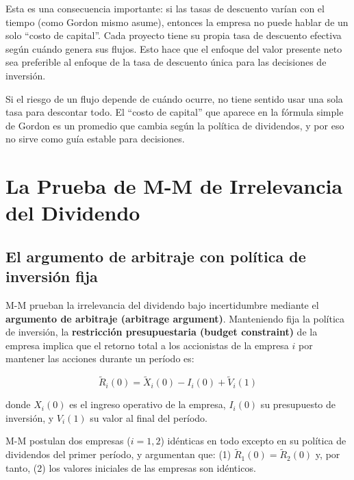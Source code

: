 \documentclass[12pt]{article}
\begin{document}
\begin{explicacion}
Esta es una consecuencia importante: si las tasas de descuento var\'ian con el tiempo (como Gordon mismo asume), entonces la empresa no puede hablar de un solo ``costo de capital''. Cada proyecto tiene su propia tasa de descuento efectiva seg\'un cu\'ando genera sus flujos. Esto hace que el enfoque del valor presente neto sea preferible al enfoque de la tasa de descuento \'unica para las decisiones de inversi\'on.
\end{explicacion}

\begin{intuicion}
Si el riesgo de un flujo depende de cu\'ando ocurre, no tiene sentido usar una sola tasa para descontar todo. El ``costo de capital'' que aparece en la f\'ormula simple de Gordon es un promedio que cambia seg\'un la pol\'itica de dividendos, y por eso no sirve como gu\'ia estable para decisiones.
\end{intuicion}

\section{La Prueba de M-M de Irrelevancia del Dividendo}

\subsection{El argumento de arbitraje con pol\'itica de inversi\'on fija}

M-M prueban la irrelevancia del dividendo bajo incertidumbre mediante el \textbf{argumento de arbitraje (arbitrage argument)}. Manteniendo fija la pol\'itica de inversi\'on, la \textbf{restricci\'on presupuestaria (budget constraint)} de la empresa implica que el retorno total a los accionistas de la empresa $i$ por mantener las acciones durante un per\'iodo es:

\[
\tilde{R}_i(0) = \tilde{X}_i(0) - I_i(0) + \tilde{V}_i(1)
\]

donde $X_i(0)$ es el ingreso operativo de la empresa, $I_i(0)$ su presupuesto de inversi\'on, y $V_i(1)$ su valor al final del per\'iodo.

M-M postulan dos empresas ($i = 1, 2$) id\'enticas en todo excepto en su pol\'itica de dividendos del primer per\'iodo, y argumentan que: (1) $\tilde{R}_1(0) = \tilde{R}_2(0)$ y, por tanto, (2) los valores iniciales de las empresas son id\'enticos.
\end{document}
